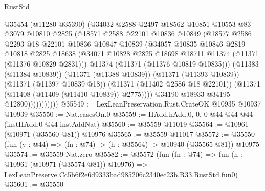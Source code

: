 \begin{lexlean}{RustStd}
\begin{coremodule}
                        @35454
                        (@11280 @35390)
                        (@34032
                          @2588
                          @2497
                          @18562
                          @10851
                          @10553
                          @83
                          @3079
                          @10810
                          @2825
                          (@18571
                            @2588
                            @22101
                            @10836
                            @10849
                            (@18577
                              @2586
                              @2293
                              @18
                              @22101
                              @10836
                              @10847
                              @10839
                              (@34057
                                @10835
                                @10846
                                @2819
                                @10818
                                @2825
                                @18638
                                (@34071
                                  @10828
                                  @2825
                                  @18698
                                  @18711
                                  @11374
                                  (@11371 (@11376 @10829 @2831)))
                                @11374
                                (@11371 (@11376 @10819 @10835)))
                              (@11383 (@11384 @10839))
                              (@11371 (@11388 @10839))
                              (@11371 (@11393 @10839))
                              (@11371 (@11397 @10839 @18))
                              (@11371 (@11402 @2586 @18 @22101))
                              (@11371 (@11408 (@11409 (@11410 @10839)) @2775))))
                          @34190
                          @18933
                          @34195
                          @12800)))))))))))
@35549 := LexLeanPreservation.Rust.CrateOK @10935 @10937 @10939
@35550 := Nat.casesOn.{0}
@35559 := HAdd.hAdd.{0, 0, 0} @44 @44 @44 (instHAdd.{0} @44 instAddNat)
@35560 := @35559 @11019
@35564 := @10961 (@10971 (@35560 @81)) @10976
@35565 := @35559 @11017
@35572 := @35550 (fun (y : @44) => (fn : @74) -> (h : @35564) -> @10940 (@35565 @81)) @10975
@35574 := @35559 Nat.zero
@35582 := @35572
    (fun (fn : @74) =>
    fun (h : @10961 (@10971 (@35574 @81)) @10976) =>
    LexLeanPreserve.Cc5b6f2e6d9333bad985206c2340ec23b.R33.RustStd.fun0)
@35601 := @35550

\end{coremodule}
\end{lexlean}
